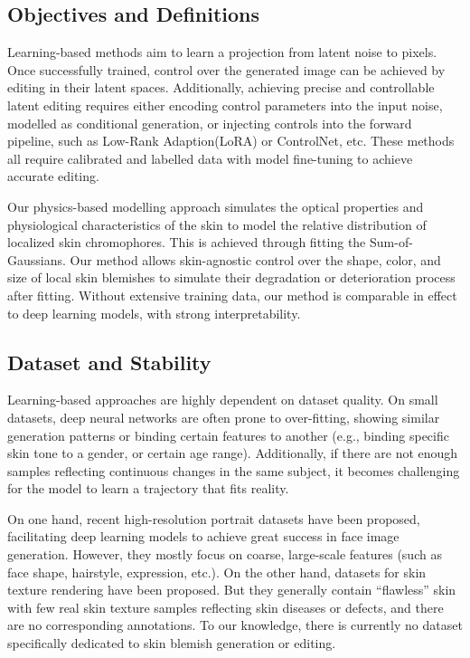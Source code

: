 \begin{spacing}{1.5}
\subsection{Objectives and Definitions}

Learning-based methods aim to learn a projection from latent noise to pixels\cite{goodfellowGenerativeAdversarialNetworks2014,DBLP:conf/nips/HoJA20,DBLP:journals/corr/KingmaW13}. Once successfully trained, control over the generated image can be achieved by editing in their latent spaces\cite{DBLP:journals/corr/abs-1812-04948, DBLP:journals/corr/abs-1907-10786}. Additionally, achieving precise and controllable latent editing requires either encoding control parameters into the input noise, modelled as conditional generation\cite{isolaImagetoimageTranslationConditional2017}, or injecting controls into the forward pipeline, such as Low-Rank Adaption(LoRA)\cite{2021arXiv210609685H} or ControlNet\cite{2023arXiv230205543Z}, etc. These methods all require calibrated and labelled data with model fine-tuning to achieve accurate editing.

Our physics-based modelling approach simulates the optical properties and physiological characteristics of the skin to model the relative distribution of localized skin chromophores. This is achieved through fitting the Sum-of-Gaussians. Our method allows skin-agnostic control over the shape, color, and size of local skin blemishes to simulate their degradation or deterioration process after fitting. Without extensive training data, our method is comparable in effect to deep learning models, with strong interpretability.

\subsection{Dataset and Stability}

Learning-based approaches are highly dependent on dataset quality. On small datasets, deep neural networks are often prone to over-fitting, showing similar generation patterns or binding certain features to another (e.g., binding specific skin tone to a gender, or certain age range). Additionally, if there are not enough samples reflecting continuous changes in the same subject, it becomes challenging for the model to learn a trajectory that fits reality.

On one hand, recent high-resolution portrait datasets\cite{DBLP:journals/corr/abs-1812-04948} have been proposed, facilitating deep learning models to achieve great success in face image generation. However, they mostly focus on coarse, large-scale features (such as face shape, hairstyle, expression, etc.). On the other hand, datasets for skin texture rendering\cite{Bai_2023_CVPR} have been proposed. But they generally contain “flawless” skin with few real skin texture samples reflecting skin diseases or defects, and there are no corresponding annotations. To our knowledge, there is currently no dataset specifically dedicated to skin blemish generation or editing.


\end{spacing}
